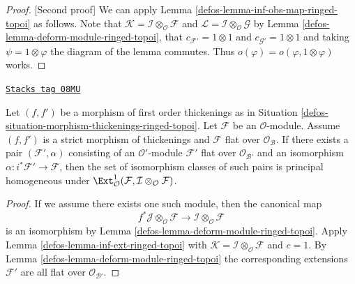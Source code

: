 \begin{proof}
[Second proof]
We can apply Lemma \ref{defos-lemma-inf-obs-map-ringed-topoi} as follows. Note that
$\mathcal{K} = \mathcal{I} \otimes_\mathcal{O} \mathcal{F}$ and
$\mathcal{L} = \mathcal{I} \otimes_\mathcal{O} \mathcal{G}$
by Lemma \ref{defos-lemma-deform-module-ringed-topoi}, that
$c_{\mathcal{F}'} = 1 \otimes 1$ and $c_{\mathcal{G}'} = 1 \otimes 1$
and taking $\psi = 1 \otimes \varphi$ the diagram of the lemma
commutes. Thus $o(\varphi) = o(\varphi, 1 \otimes \varphi)$
works.
\end{proof}

\begin{lemma}
\label{defos-lemma-inf-ext-rel-ringed-topoi}
\href{https://stacks.math.columbia.edu/tag/08MU}{\texttt{Stacks tag 08MU}}

Let $(f, f')$ be a morphism of first order thickenings as in
Situation \ref{defos-situation-morphism-thickenings-ringed-topoi}.
Let $\mathcal{F}$ be an $\mathcal{O}$-module.
Assume $(f, f')$ is a strict morphism of thickenings and
$\mathcal{F}$ flat over $\mathcal{O}_\mathcal{B}$. If there exists a pair
$(\mathcal{F}', \alpha)$ consisting of an
$\mathcal{O}'$-module $\mathcal{F}'$ flat over $\mathcal{O}_{\mathcal{B}'}$
and an isomorphism
$\alpha : i^*\mathcal{F}' \to \mathcal{F}$, then the set of
isomorphism classes of such pairs is principal homogeneous
under
$\Ext^1_\mathcal{O}(
\mathcal{F}, \mathcal{I} \otimes_\mathcal{O} \mathcal{F})$.
\end{lemma}

\begin{proof}

If we assume there exists one such module, then the canonical map
$$
f^*\mathcal{J} \otimes_\mathcal{O} \mathcal{F} \to
\mathcal{I} \otimes_\mathcal{O} \mathcal{F}
$$
is an isomorphism by Lemma \ref{defos-lemma-deform-module-ringed-topoi}. Apply
Lemma \ref{defos-lemma-inf-ext-ringed-topoi} with $\mathcal{K} =
\mathcal{I} \otimes_\mathcal{O} \mathcal{F}$
and $c = 1$. By Lemma \ref{defos-lemma-deform-module-ringed-topoi}
the corresponding extensions
$\mathcal{F}'$ are all flat over $\mathcal{O}_{\mathcal{B}'}$.
\end{proof}

